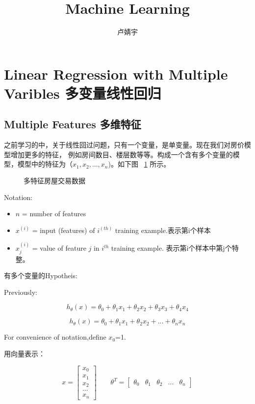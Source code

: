 \documentclass[UTF8]{ctexart}
\title{\heiti Machine Learning}
\author{卢婧宇}
\begin{document}
\maketitle
\tableofcontents

\newpage
\section{Linear Regression with Multiple Varibles 多变量线性回归}
\subsection{Multiple Features 多维特征}
之前学习的中，关于线性回过问题，只有一个变量，是单变量。现在我们对房价模型增加更多的特征，
例如房间数目、楼层数等等。构成一个含有多个变量的模型，模型中的特征为（$x_1,x_2,...,x_n$)。如下图 ~\ref{fig:1} 所示。
\begin{figure}[htb]
 \caption{多特征房屋交易数据}
 \label{fig:1}
 \end{figure}

 Notation:
\begin{itemize}
  \item $n$ = number of features
  \item $x^{(i)}$ = input (features) of $i^{(th)}$ training example.表示第i个样本
  \item $x_j^{(i)}$ = value of feature $j$ in $i^{th}$ training example. 表示第i个样本中第j个特整。
\end{itemize}

有多个变量的Hypotheis:

Previously:

\begin{equation*}
h_\theta(x) = \theta_0 + \theta_1x_1 + \theta_2x_2 + \theta_3x_3 + \theta_4x_4
\end{equation*}

\begin{equation*}
h_\theta(x) = \theta_0 + \theta_1x_1 + \theta_2x_2 + ...+ \theta_nx_n
\end{equation*}

For convenience of notation,define $x_0$=1.

用向量表示：

\begin{equation*}
  x=
  \begin{bmatrix}
    x_0\\
    x_1\\
    x_2\\
    ...\\
    x_n
  \end{bmatrix} \qquad
  \theta^{T} =
   \begin{bmatrix}
     \theta_0 & \theta_1 & \theta_2 & ... & \theta_n
   \end{bmatrix}
\end{equation*}
\end{document}
